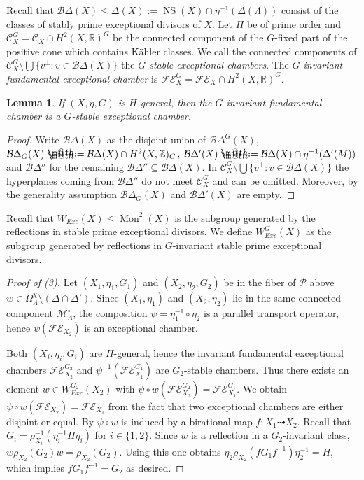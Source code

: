 \documentclass{amsart}
\makeatletter
\theoremstyle{definition}
\theoremstyle{plain}
\newtheorem{lemma}[definition]{Lemma}
\DeclareMathOperator{\Mo}{Mon}
\DeclareMathOperator{\ns}{NS}
\newcommand{\RR}{\mathbb{R}}
\newcommand{\ZZ}{\mathbb{Z}}
\newcommand{\F}{\mathcal{F}}
\newcommand{\E}{\mathcal{E}}
\newcommand{\C}{\mathcal{C}}
\newcommand{\B}{\mathcal{B}}
\renewcommand{\P}{\mathcal{P}}
\newcommand*{\defeq}{\mathrel{\rlap{%
                     \raisebox{0.3ex}{$\m@th\cdot$}}%
                     \raisebox{-0.3ex}{$\m@th\cdot$}}%
                     =}
\makeatother
\begin{document}
Recall that $\B\Delta(X) \leq \Delta(X) :=
\ns(X) \cap \eta^{-1}(\Delta(\Lambda))$ consist of the classes
of stably prime exceptional divisors of $X$. Let $H$ be of prime order and $\C_X^{G}= \C_X \cap H^2(X,\RR)^G$ be the connected
component of the $G$-fixed part of the positive cone which contains K\"ahler classes. We call the connected components of $\C_X^{G}\setminus \bigcup\{v^\perp : v \in \B \Delta(X)\}$ the \emph{$G$-stable exceptional chambers}.
The \emph{$G$-invariant fundamental exceptional chamber} is $\mathcal{FE}_X^G=\mathcal{FE}_X \cap H^2(X,\RR)^G$.
\begin{lemma}
If $(X,\eta,G)$ is $H$-general, then the $G$-invariant fundamental chamber is a $G$-stable exceptional chamber.
\end{lemma}
\begin{proof}
Write $\B\Delta(X)$ as the disjoint union of $\B\Delta^G(X)$,
$\B\Delta_G(X) \defeq\B\Delta(X) \cap H^2(X,\ZZ)_G$, $\B\Delta'(X)\defeq \B\Delta(X) \cap \eta^{-1}(\Delta'(M))$ and $\B\Delta''$ for the remaining $\B\Delta''\subseteq \B\Delta(X)$.
In  $\C^G_X \setminus \bigcup\{v^\perp : v \in \B \Delta(X)\}$
the hyperplanes coming from $\B\Delta''$ do not meet $\C_X^{G}$ and can be omitted. Moreover, by the generality assumption $\B\Delta_G(X)$ and $\B\Delta'(X)$ are empty.
\end{proof}

Recall that $W_{Exc}(X)\leq \Mo^2(X)$ is the subgroup generated by the reflections in stable prime exceptional divisors. We define $W^G_{Exc}(X)$ as the subgroup generated by reflections in $G$-invariant stable prime exceptional divisors.

\begin{proof}[Proof of  (3)]
 Let $(X_1,\eta_1, G_1)$ and $(X_2,\eta_2, G_2)$ be in the fiber of $\P$ above $w\in \Omega^\chi_\Lambda \setminus (\Delta \cap \Delta')$.
 Since $(X_1,\eta_1)$ and $(X_2,\eta_2)$ lie in the same connected component $\mathcal{M}_\Lambda^\circ$, the composition $\psi=\eta_1^{-1} \circ \eta_2$ is a parallel transport operator, hence $\psi(\F\E_{X_2})$ is an exceptional chamber.

 Both $(X_i,\eta_i,G_i)$ are $H$-general, hence the invariant fundamental exceptional chambers $\F\E^{G_2}_{X_2}$ and $\psi^{-1}(\F\E_{X_1}^{G_1})$ are
 $G_2$-stable chambers.
 Thus there exists an element $w \in W^{G_2}_{Exc}(X_2)$ with $\psi \circ w (\F\E_{X_2}^{G_2})= \F\E_{X_1}^{G_1}$. We obtain $\psi \circ w (\F\E_{X_2})= \F\E_{X_1}$
 from the fact that two exceptional chambers are either disjoint or equal.
 By  $\psi \circ w$ is induced by a birational map $f\colon X_1 \dashrightarrow X_2$.
 Recall that $G_i = \rho_{X_i}^{-1}(\eta_i^{-1}H\eta_i)$ for $i\in\{1,2\}$.
 Since $w$ is a reflection in a $G_2$-invariant class, $w \rho_{X_2}(G_2)w =\rho_{X_2}(G_2)$. Using this one obtains
$\eta_2\rho_{X_2}(fG_1f^{-1})\eta_2^{-1}
= H$,
which implies $f G_1 f^{-1}=G_2$ as desired.
\end{proof}
\end{document}
